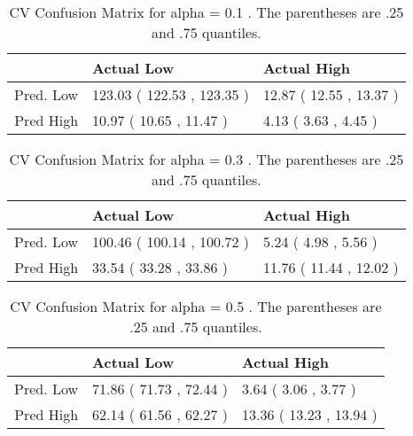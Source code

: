 \begin{table}[H]
\begin{center}
\begin{tabular}{rll}
  \hline
 & Actual Low & Actual High \\ 
  \hline
Pred. Low & 123.03 ( 122.53 , 123.35 ) & 12.87 ( 12.55 , 13.37 ) \\ 
  Pred High & 10.97 ( 10.65 , 11.47 ) & 4.13 ( 3.63 , 4.45 ) \\ 
   \hline
\end{tabular}
\caption{CV Confusion Matrix for alpha = 0.1 . The parentheses are .25 and .75 quantiles.}
\end{center}
\end{table}
\begin{table}[H]
\begin{center}
\begin{tabular}{rll}
  \hline
 & Actual Low & Actual High \\ 
  \hline
Pred. Low & 100.46 ( 100.14 , 100.72 ) & 5.24 ( 4.98 , 5.56 ) \\ 
  Pred High & 33.54 ( 33.28 , 33.86 ) & 11.76 ( 11.44 , 12.02 ) \\ 
   \hline
\end{tabular}
\caption{CV Confusion Matrix for alpha = 0.3 . The parentheses are .25 and .75 quantiles.}
\end{center}
\end{table}
\begin{table}[H]
\begin{center}
\begin{tabular}{rll}
  \hline
 & Actual Low & Actual High \\ 
  \hline
Pred. Low & 71.86 ( 71.73 , 72.44 ) & 3.64 ( 3.06 , 3.77 ) \\ 
  Pred High & 62.14 ( 61.56 , 62.27 ) & 13.36 ( 13.23 , 13.94 ) \\ 
   \hline
\end{tabular}
\caption{CV Confusion Matrix for alpha = 0.5 . The parentheses are .25 and .75 quantiles.}
\end{center}
\end{table}

